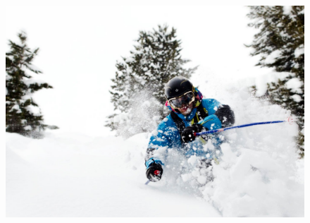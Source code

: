 \documentclass[paper=letter,fontsize=11pt]{scrartcl} %
\begin{document}
\begin{figure}
		\vspace{1em}
        \centering            
        \includegraphics[height=0.25\textwidth]{133107_166579826714314_3462381_o.jpg}
        
\end{figure}
\end{document}
